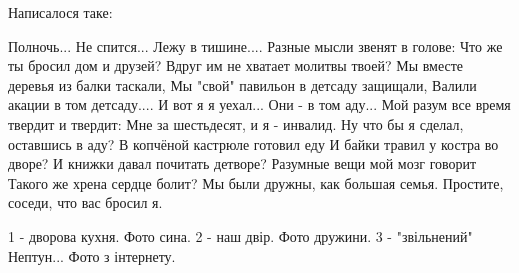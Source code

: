Написалося таке:

\obeycr
Полночь... Не спится... Лежу в тишине....
Разные мысли звенят в голове:
Что же ты бросил дом и друзей?
Вдруг им не хватает молитвы твоей?
Мы вместе деревья из балки таскали,
Мы "свой" павильон в детсаду защищали,
Валили акации в том детсаду....
И вот я я уехал...
Они - в том аду...
\smallskip
Мой разум все время твердит и твердит:
Мне за шестьдесят, и я - инвалид.
Ну что бы я сделал, оставшись в аду?
В копчёной кастрюле готовил еду
И байки травил  у костра во дворе?
И книжки давал почитать детворе?
Разумные вещи мой мозг говорит
Такого же хрена  сердце болит?
\smallskip
Мы были дружны, как большая семья.
Простите, соседи, что вас бросил я.
\restorecr

1 - дворова кухня. Фото сина.
2 - наш двір. Фото дружини.
3 - "звільнений" Нептун... Фото з інтернету.

